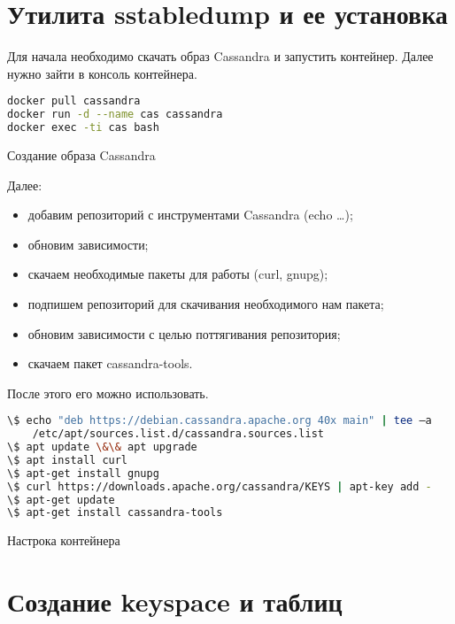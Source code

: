 \section{Утилита sstabledump и ее установка}

Для начала необходимо скачать образ Cassandra и запустить контейнер.
Далее нужно зайти в консоль контейнера.

\begin{lstlisting}[language=bash]
docker pull cassandra
docker run -d --name cas cassandra
docker exec -ti cas bash
\end{lstlisting}

\begin{image}
	\caption{Создание образа Cassandra}
	\label{fig:docker:cas}
\end{image}

Далее:
\begin{itemize}
	\item добавим репозиторий с инструментами Cassandra (echo …);
	\item обновим зависимости;
	\item скачаем необходимые пакеты для работы (curl, gnupg);
	\item подпишем репозиторий для скачивания необходимого нам пакета;
	\item обновим зависимости с целью поттягивания репозитория;
	\item скачаем пакет cassandra-tools.
\end{itemize}

После этого его можно использовать.

\begin{lstlisting}[language=bash]
\$ echo "deb https://debian.cassandra.apache.org 40x main" | tee –a
	/etc/apt/sources.list.d/cassandra.sources.list
\$ apt update \&\& apt upgrade
\$ apt install curl
\$ apt-get install gnupg
\$ curl https://downloads.apache.org/cassandra/KEYS | apt-key add -
\$ apt-get update
\$ apt-get install cassandra-tools
\end{lstlisting}

\begin{image}
	\caption{Настрока контейнера}
	\label{fig:docker:bash}
\end{image}

\section{Создание keyspace и таблиц}

